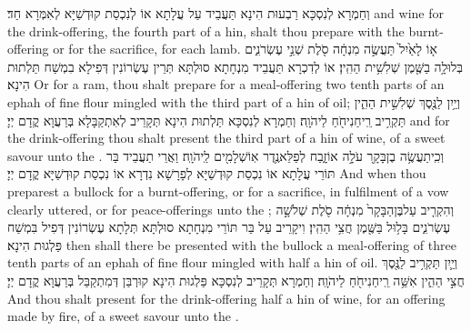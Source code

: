 {וְחַמְרָא לְנִסְכָּא רַבְעוּת הִינָא תַּעֲבֵיד עַל עֲלָתָא אוֹ לְנִכְסַת קוּדְשַׁיָּא לְאִמְּרָא חַד׃}
{and wine for the drink-offering, the fourth part of a hin, shalt thou prepare with the burnt-offering or for the sacrifice, for each lamb.}{}
{א֤וֹ לָאַ֙יִל֙ תַּעֲשֶׂ֣ה מִנְחָ֔ה סֹ֖לֶת שְׁנֵ֣י עֶשְׂרֹנִ֑ים בְּלוּלָ֥ה בַשֶּׁ֖מֶן שְׁלִשִׁ֥ית הַהִֽין׃}
{אוֹ לְדִכְרָא תַּעֲבֵיד מִנְחָתָא סוּלְתָּא תְּרֵין עֶשְׂרוֹנִין דְּפִילָא בִמְשַׁח תַּלְתוּת הִינָא׃}
{Or for a ram, thou shalt prepare for a meal-offering two tenth parts of an ephah of fine flour mingled with the third part of a hin of oil;}{}
{וְיַ֥יִן לַנֶּ֖סֶךְ שְׁלִשִׁ֣ית הַהִ֑ין תַּקְרִ֥יב רֵֽיחַ\maqqaf נִיחֹ֖חַ לַיהֹוָֽה׃}
{וְחַמְרָא לְנִסְכָּא תַּלְתוּת הִינָא תְּקָרֵיב לְאִתְקַבָּלָא בְּרַעֲוָא קֳדָם יְיָ׃}
{and for the drink-offering thou shalt present the third part of a hin of wine, of a sweet savour unto the \lord.}{}
{וְכִֽי\maqqaf תַעֲשֶׂ֥ה בֶן\maqqaf בָּקָ֖ר עֹלָ֣ה אוֹ\maqqaf זָ֑בַח לְפַלֵּא\maqqaf נֶ֥דֶר אֽוֹ\maqqaf שְׁלָמִ֖ים לַֽיהֹוָֽה׃}
{וַאֲרֵי תַעֲבֵיד בַּר תּוֹרֵי עֲלָתָא אוֹ נִכְסַת קוּדְשַׁיָּא לְפָרָשָׁא נִדְרָא אוֹ נִכְסַת קוּדְשַׁיָּא קֳדָם יְיָ׃}
{And when thou preparest a bullock for a burnt-offering, or for a sacrifice, in fulfilment of a vow clearly uttered, or for peace-offerings unto the \lord;}{}
{וְהִקְרִ֤יב עַל\maqqaf בֶּן\maqqaf הַבָּקָר֙ מִנְחָ֔ה סֹ֖לֶת שְׁלֹשָׁ֣ה עֶשְׂרֹנִ֑ים בָּל֥וּל בַּשֶּׁ֖מֶן חֲצִ֥י הַהִֽין׃}
{וִיקָרֵיב עַל בַּר תּוֹרֵי מִנְחָתָא סוּלְתָּא תְּלָתָא עֶשְׂרוֹנִין דְּפִיל בִּמְשַׁח פַּלְגוּת הִינָא׃}
{then shall there be presented with the bullock a meal-offering of three tenth parts of an ephah of fine flour mingled with half a hin of oil.}{}
{וְיַ֛יִן תַּקְרִ֥יב לַנֶּ֖סֶךְ חֲצִ֣י הַהִ֑ין אִשֵּׁ֥ה רֵֽיחַ\maqqaf נִיחֹ֖חַ לַיהֹוָֽה׃}
{וְחַמְרָא תְּקָרֵיב לְנִסְכָּא פַּלְגוּת הִינָא קוּרְבַּן דְּמִתְקַבַּל בְּרַעֲוָא קֳדָם יְיָ׃}
{And thou shalt present for the drink-offering half a hin of wine, for an offering made by fire, of a sweet savour unto the \lord.}{}
